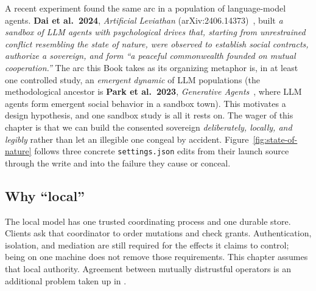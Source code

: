 \documentclass[11pt,a4paper]{article}
\theoremstyle{definition}
\theoremstyle{plain}
\begin{document}
A recent experiment found the same arc in a population of language-model
agents. \textbf{Dai et al.\ 2024}, \emph{Artificial Leviathan}
(arXiv:2406.14373)~, built \emph{a sandbox of LLM agents with
psychological drives that, starting from unrestrained conflict resembling the state
of nature, were observed to establish social contracts, authorize a sovereign, and
form ``a peaceful commonwealth founded on mutual cooperation.''} The arc this
Book takes as its organizing metaphor is, in at least one controlled study, an
\emph{emergent dynamic} of LLM populations (the methodological ancestor is
\textbf{Park et al.\ 2023}, \emph{Generative Agents}~, where LLM
agents form emergent social behavior in a sandbox town). This motivates a
design hypothesis, and one sandbox study is all it rests on.
The wager of this chapter is that we can build the consented sovereign
\emph{deliberately, locally, and legibly} rather than let an illegible one congeal
by accident. Figure~\ref{fig:state-of-nature} follows three concrete
\texttt{settings.json} edits from their launch source through the write and into
the failure they cause or conceal.

\subsection{Why ``local''}\label{sec:local}
The local model has one trusted coordinating process and one durable store.
Clients ask that coordinator to order mutations and check grants. Authentication,
isolation, and mediation are still required for the effects it claims to control;
being on one machine does not remove those requirements. This chapter assumes
that local authority. Agreement between mutually distrustful operators is an
additional problem taken up in .

\end{document}
